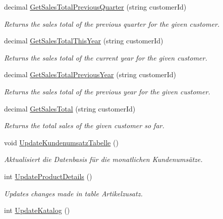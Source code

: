 \begin{DoxyCompactItemize}
decimal \hyperlink{class_products_1_1_data_1_1_data_service_ad9d45dcff398f3d7d2de20fcf1430acf}{Get\+Sales\+Total\+Previous\+Quarter} (string customer\+Id)
\begin{DoxyCompactList}\small\item\em Returns the sales total of the previous quarter for the given customer. \end{DoxyCompactList}\item 
decimal \hyperlink{class_products_1_1_data_1_1_data_service_a83632739d6cab7e10c980e3a5a0dd590}{Get\+Sales\+Total\+This\+Year} (string customer\+Id)
\begin{DoxyCompactList}\small\item\em Returns the sales total of the current year for the given customer. \end{DoxyCompactList}\item 
decimal \hyperlink{class_products_1_1_data_1_1_data_service_a43c3ace159b078b304c6002c106cd2d0}{Get\+Sales\+Total\+Previous\+Year} (string customer\+Id)
\begin{DoxyCompactList}\small\item\em Returns the sales total of the previous year for the given customer. \end{DoxyCompactList}\item 
decimal \hyperlink{class_products_1_1_data_1_1_data_service_a0b799c683bb0fdab28a4b25a2d0de7fb}{Get\+Sales\+Total} (string customer\+Id)
\begin{DoxyCompactList}\small\item\em Returns the total sales of the given customer so far. \end{DoxyCompactList}\item 
void \hyperlink{class_products_1_1_data_1_1_data_service_a611c26b842c4c4213ecfffd0f156eff8}{Update\+Kundenumsatz\+Tabelle} ()
\begin{DoxyCompactList}\small\item\em Aktualisiert die Datenbasis für die monatlichen Kundenumsätze. \end{DoxyCompactList}\item 
int \hyperlink{class_products_1_1_data_1_1_data_service_abbf46a133b3bcc786304777d5819a2e8}{Update\+Product\+Details} ()
\begin{DoxyCompactList}\small\item\em Updates changes made in table Artikelzusatz. \end{DoxyCompactList}\item 
int \hyperlink{class_products_1_1_data_1_1_data_service_acdc6efb145ffcc722b61f6a12a6f56a8}{Update\+Katalog} ()

\end{DoxyCompactItemize}
